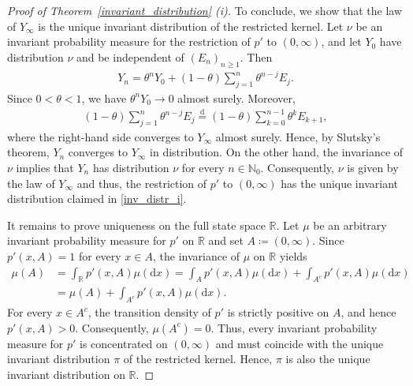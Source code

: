 \documentclass[12pt]{article}
\newcommand{\N}{\mathbb{N}} %
\newcommand{\R}{\mathbb{R}} %
\newcommand{\1}{\mathds{1}}
\renewcommand{\d}{\mathrm{d}}
\theoremstyle{definition}
\theoremstyle{plain}
\theoremstyle{remark}
\begin{document}
\begin{proof}[Proof of Theorem~\ref{invariant_distribution} (i)]
To conclude, we show that the law of $Y_\infty$ is the unique invariant distribution of the restricted kernel. Let $\nu$ be an invariant probability measure for the restriction of $p'$ to $(0,\infty)$, and let $Y_0$ have distribution $\nu$ and be independent of $(E_n)_{n\geq1}$. Then
\begin{align*}
    Y_n  = \theta^nY_0  +(1-\theta)\sum_{j=1}^n\theta^{n-j}E_j.
\end{align*}
Since $0<\theta<1$, we have $\theta^nY_0\to0$ almost surely. Moreover,
\begin{align*}
    (1-\theta)\sum_{j=1}^n\theta^{n-j}E_j  \overset{\d}{=}(1-\theta)\sum_{k=0}^{n-1}\theta^kE_{k+1},
\end{align*}
where the right-hand side converges to $Y_\infty$ almost surely. Hence, by Slutsky's theorem, $Y_n$ converges to $Y_\infty$ in distribution. On the other hand, the invariance of $\nu$ implies that $Y_n$ has distribution $\nu$ for every $n\in\N_0$. Consequently, $\nu $ is given by the law of $Y_\infty$ and thus, the restriction of $p'$ to $(0,\infty)$ has the unique invariant distribution claimed in \eqref{inv_distr_i}.

It remains to prove uniqueness on the full state space $\R$. Let $\mu$ be an arbitrary invariant probability measure for $p'$ on $\R$ and set $A\coloneqq(0,\infty)$. Since $p'(x,A)=1$ for every $x\in A$, the invariance of $\mu$ on $\R$ yields
\begin{align*}
    \mu(A)
    &= \int_{\R}p'(x,A)\mu(\d x) 
    = \int_Ap'(x,A)\mu(\d x)
       +\int_{A^c}p'(x,A)\mu(\d x) 
    \\&= \mu(A)+\int_{A^c}p'(x,A)\mu(\d x).
\end{align*}
For every $x\in A^c$, the transition density of $p'$ is strictly positive on $A$, and hence $p'(x,A)>0$. Consequently, $\mu(A^c)=0$. Thus, every invariant probability measure for $p'$ is concentrated on $(0,\infty)$ and must coincide with the unique invariant distribution $\pi$ of the restricted kernel. Hence, $\pi$ is also the unique invariant distribution on $\R$.
\end{proof}
\end{document}
